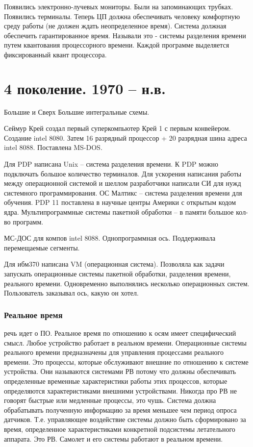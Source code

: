 Появились электронно-лучевых мониторы. Были на запоминающих трубках. Появились терминалы. Теперь ЦП должна обеспечивать человеку комфортную среду работы (не должен ждать неопределенное время).  Система должная обеспечить гарантированное время. Называли это - системы разделения времени путем квантования процессорного времени. Каждой программе выделяется фиксированный квант процессора.

\section{4 поколение. 1970 – н.в.}

Большие и Сверх Большие интегральные схемы. 

Сеймур Крей создал первый суперкомпьютер Крей 1 с первым конвейером.
Создание intel 8080. Затем 16 разрядный процессор + 20 разрядная шина адреса intel 8088. Поставлена MS-DOS.

Для PDP написана Unix – система разделения времени. К PDP можно подключать большое количество терминалов. Для ускорения написания работы между операционной системой и шеллом разработчики написали СИ для нужд системного программирования. ОС Малтикс – система разделения времени для обучения. 
PDP 11 поставлена в научные центры Америки с открытым кодом ядра.
Мультипрограммные системы пакетной обработки – в памяти большое кол-во программ. 

МС-ДОС для компов intel 8088. Однопрограммная ось. Поддерживала перемещаемые сегменты. 

Для ибм370 написана VM (операционная система). Позволяла как задачи запускать операционные системы пакетной обработки, разделения времени, реального времени. Одновременно выполнялись несколько операционных систем. Пользователь заказывал ось, какую он хотел. 

\subsubsection{Реальное время} речь идет о ПО. Реальное время по отношению к осям имеет специфический смысл. Любое устройство работает в реальном времени. Операционные системы реального времени предназначены для управления процессами реального времени. Это процессы, которые обслуживают внешние по отношению к системе устройства. Они называются системами РВ потому что должны обеспечивать определенные временные характеристики работы этих процессов, которые определяются характеристиками внешними устройствами. Никогда про РВ не говорят быстрые или медленные процессы, это чушь. Система должна обрабатывать полученную информацию за время меньшее чем период опроса датчиков. Т.е. управляющее воздействие системы должно быть сформировано за время, определенное характеристиками конкретной подсистемы летательного аппарата. Это РВ. Самолет и его системы работают в реальном времени.

